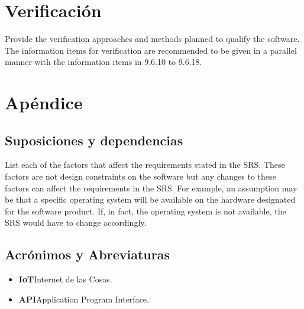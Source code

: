 \documentclass[12pt, a4paper, twoside]{article}
\newcommand\ttab{\tab \hspace{-5cm}}
\begin{document}
 \section{Verificación}
 Provide the verification approaches and methods planned to qualify the software. The information
 items for verification are recommended to be given in a parallel manner with the information items in
 9.6.10 to 9.6.18.

\section{Apéndice}
\subsection{Suposiciones y dependencias}
List each of the factors that affect the requirements stated in the SRS. These factors are not design
constraints on the software but any changes to these factors can affect the requirements in the SRS.
For example, an assumption may be that a specific operating system will be available on the hardware
designated for the software product. If, in fact, the operating system is not available, the SRS would
have to change accordingly.
\subsection{Acrónimos y Abreviaturas}
\begin{itemize}
    \item \textbf{IoT}\ttab Internet de las Cosas.
    \item \textbf{API}\ttab Application Program Interface.
  \end{itemize}
\end{document}
